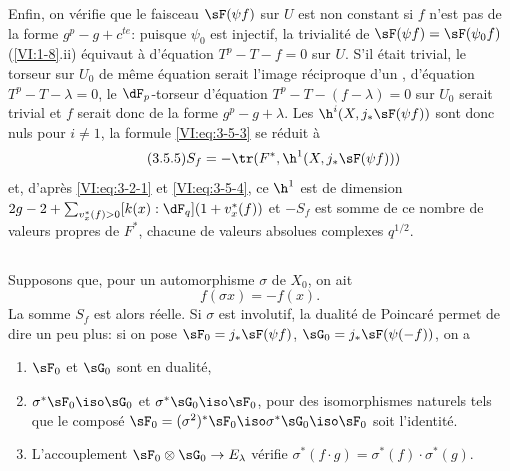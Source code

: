 Enfin, on vérifie que le faisceau $\sF(\psi f)$ sur $U$ est non constant si 
$f$ n'est pas de la forme $g^p-g+c^{t e}$: puisque $\psi_0$ est injectif, la 
trivialité de $\sF(\psi f)=\sF(\psi_0 f)$ (\ref{VI:1-8}.ii) équivaut à 
 d'équation $T^p-T-f=0$ sur $U$. S'il était trivial, 
le torseur sur $U_0$ de même équation 
serait l'image réciproque d'un 
, d'équation $T^p-T-\lambda=0$, le 
$\dF_p$-torseur d'équation $T^p-T-(f-\lambda)=0$ sur $U_0$ serait trivial 
et $f$ serait donc de la forme $g^p-g+\lambda$. Les 
$\h^i(X,j_\ast \sF(\psi f))$ sont donc nuls pour $i\ne 1$, la formule 
\eqref{VI:eq:3-5-3} se réduit à 
\begin{equation*}\tag{3.5.5}\label{VI:eq:3-5-5}
  S_f = -\tr(F^\ast,\h^1(X,j_\ast \sF(\psi f))) 
\end{equation*}
et, d'après \eqref{VI:eq:3-2-1} et \eqref{VI:eq:3-5-4}, ce $\h^1$ est de 
dimension $2 g-2+\sum_{v_x^\ast(f)>0} [k(x):\dF_q](1+v_x^\ast(f))$ et $-S_f$ 
est somme de ce nombre de valeurs propres de $F^\ast$, chacune de valeurs 
absolues complexes $q^{1/2}$. 





\subsection{}\label{VI:3-6}

Supposons que, pour un automorphisme $\sigma$ de $X_0$, on ait 
\[
  f(\sigma x) = - f(x) \text{.} 
\]
La somme $S_f$ est alors réelle. Si $\sigma$ est involutif, la dualité de 
Poincaré permet de dire un peu plus: si on pose 
$\sF_0=j_\ast \sF(\psi f)$, $\sG_0 = j_\ast \sF(\psi(-f))$, on a 
\begin{enumerate}[\indent a)]
  \item $\sF_0$ et $\sG_0$ sont en dualité, 
  \item $\sigma^\ast \sF_0 \iso \sG_0$ et $\sigma^\ast \sG_0 \iso \sF_0$, pour 
    des isomorphismes naturels tels que le composé 
    $\sF_0=(\sigma^2)^\ast \sF_0 \iso \sigma^\ast \sG_0 \iso \sF_0$ soit 
    l'identité. 
  \item L'accouplement $\sF_0\otimes \sG_0 \to E_\lambda$ vérifie 
    $\sigma^\ast(f\cdot g) = \sigma^\ast(f) \cdot \sigma^\ast (g)$. 
\end{enumerate} 


